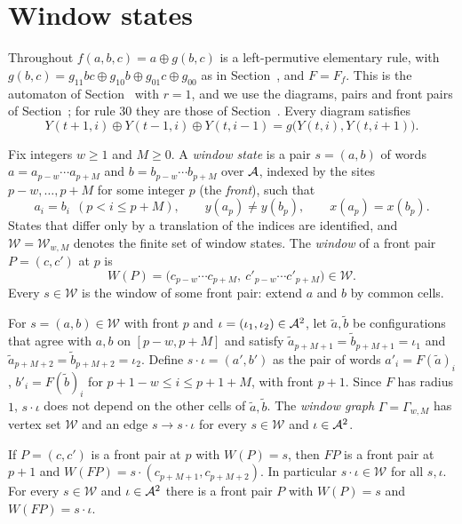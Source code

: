 \section{Window states}\label{tc:sec:window}



Throughout $f(a,b,c)=a\oplus g(b,c)$ is a left-permutive elementary rule, with $g(b,c)=g_{11}bc\oplus g_{10}b\oplus g_{01}c\oplus g_{00}$ as in Section~, and $F=F_f$. This is the automaton of Section~ with $r=1$, and we use the diagrams, pairs and front pairs of Section~; for rule $30$ they are those of Section~. Every diagram satisfies
\begin{equation}\label{pm:eq:rec}
Y(t+1,i)\oplus Y(t-1,i)\oplus Y(t,i-1)=g\bigl(Y(t,i),Y(t,i+1)\bigr).
\end{equation}




Fix integers $w\ge1$ and $M\ge0$. A \emph{window state} is a pair $s=(a,b)$ of words $a=a_{p-w}\cdots a_{p+M}$ and $b=b_{p-w}\cdots b_{p+M}$ over $\mathcal{A}$, indexed by the sites $p-w,\dots,p+M$ for some integer $p$ (the \emph{front}), such that
\begin{equation}\label{r30:eq:valid}
a_i=b_i\ \ (p<i\le p+M),\qquad y(a_p)\ne y(b_p),\qquad x(a_p)=x(b_p).
\end{equation}
States that differ only by a translation of the indices are identified, and $\mathcal{W}=\mathcal{W}_{w,M}$ denotes the finite set of window states. The \emph{window} of a front pair $P=(c,c')$ at $p$ is
\[
W(P)=\bigl(c_{p-w}\cdots c_{p+M},\ c'_{p-w}\cdots c'_{p+M}\bigr)\in\mathcal{W}.
\]
Every $s\in\mathcal{W}$ is the window of some front pair: extend $a$ and $b$ by common cells.

For $s=(a,b)\in\mathcal{W}$ with front $p$ and $\iota=(\iota_1,\iota_2)\in\mathcal{A}^2$, let $\tilde a,\tilde b$ be configurations that agree with $a,b$ on $[p-w,p+M]$ and satisfy $\tilde a_{p+M+1}=\tilde b_{p+M+1}=\iota_1$ and $\tilde a_{p+M+2}=\tilde b_{p+M+2}=\iota_2$. Define $s\cdot\iota=(a',b')$ as the pair of words $a'_i=F(\tilde a)_i$, $b'_i=F(\tilde b)_i$ for $p+1-w\le i\le p+1+M$, with front $p+1$. Since $F$ has radius $1$, $s\cdot\iota$ does not depend on the other cells of $\tilde a,\tilde b$. The \emph{window graph} $\Gamma=\Gamma_{w,M}$ has vertex set $\mathcal{W}$ and an edge $s\to s\cdot\iota$ for every $s\in\mathcal{W}$ and $\iota\in\mathcal{A}^2$.

\begin{lemma}\label{r30:lem:edge}
If $P=(c,c')$ is a front pair at $p$ with $W(P)=s$, then $FP$ is a front pair at $p+1$ and $W(FP)=s\cdot(c_{p+M+1},c_{p+M+2})$. In particular $s\cdot\iota\in\mathcal{W}$ for all $s,\iota$. For every $s\in\mathcal{W}$ and $\iota\in\mathcal{A}^2$ there is a front pair $P$ with $W(P)=s$ and $W(FP)=s\cdot\iota$.
\end{lemma}

